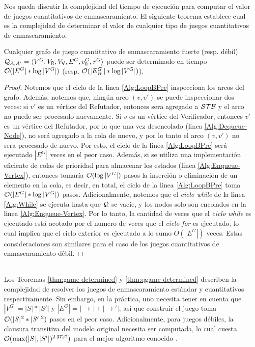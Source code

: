 Nos queda discutir la complejidad del tiempo de ejecución para computar el valor de juegos cuantitativos de enmascaramiento. 
El siguiente teorema establece cual es la complejidad de determinar el valor de cualquier tipo de juegos cuantitativos de enmascaramiento.
%
\sloppy \begin{theorem}\label{thm:qgame-determined} Cualquier grafo de juego cuantitativo de enmascaramiento fuerte (resp. débil) 
$\mathcal{Q}_{A, A'} = \langle V^G, V_{\mathsf{R}}, V_{\mathsf{V}}, E^G, v_0^G, \mathit{r}^G \rangle$ puede ser determinado en tiempo $\mathcal{O}(|E^G|*\log |V^G|)$ (resp. $\mathcal{O}(|E_W^G|*\log |V^G|)$).
\end{theorem}
\begin{proof}
Notemos que el ciclo de la linea \ref{Alg:LoopBPre} inspecciona los arcos del grafo. Además, notemos que, ningún arco $(v, v')$ se puede inspeccionar dos veces:
si $v'$ es un vértice del Refutador, entonces sera agregado a $\mathcal{STB}$ y el arco no puede ser procesado nuevamente. 
Si $v$ es un vértice del Verificador, entonces $v'$ es un vértice del Refutador, por lo que una vez desencolado (linea \ref{Alg:Dequeue-Node}), no será agregado a la cola de nuevo, y por lo tanto el arco $(v, v')$ no sera procesado de nuevo. Por esto, el ciclo de la linea \ref{Alg:LoopBPre} será ejecutado $|E^G|$ veces en el peor caso. 
Además, si se utiliza una implementación eficiente de colas de prioridad para almacenar los estados (linea \ref{Alg:Enqueue-Vertex}), entonces tomaría $\mathcal{O}(\log |V^G|)$ pasos la inserción o eliminación de un elemento en la cola, es decir, en total, el ciclo de la linea \ref{Alg:LoopBPre} toma $\mathcal{O}(|E^G|*\log |V^G|)$ pasos.
Adicionalmente, notemos que el \emph{ciclo while} de la linea \ref{Alg:While} se ejecuta hasta que $\mathcal{Q}$ se vacíe, y los nodos solo son encolados en la linea \ref{Alg:Enqueue-Vertex}. Por lo tanto, la cantidad de veces que el \emph{ciclo while} es ejecutado está acotado por el numero de veces que el \emph{ciclo for} es ejecutado, lo cual implica que el ciclo exterior es ejecutado a lo sumo $O(|E^G|)$ veces. Estas consideraciones son similares para el caso de los juegos cuantitativos de enmascaramiento débil.	

\qedhere
\end{proof} \\

Los Teoremas \ref{thm:game-determined} y \ref{thm:qgame-determined} describen la complejidad de resolver los juegos de enmascaramiento estándar y cuantitativos respectivamente. Sin embargo, en la práctica, uno necesita tener en cuenta que $|V^G| = |S|*|S'|$ y $|E^G| = |{\rightarrow}|+|{\rightarrow'}|$, así que construir el juego toma 
$\mathcal{O}(|S|^2*|S'|^2)$ pasos en el peor caso. Adicionalmente, para juegos débiles, la clausura transitiva del modelo original necesita ser computada, lo cual cuesta $\mathcal{O}(\max(|S|,|S'|)^{2.3727})$ para el mejor algoritmo conocido \cite{Wil12}.

